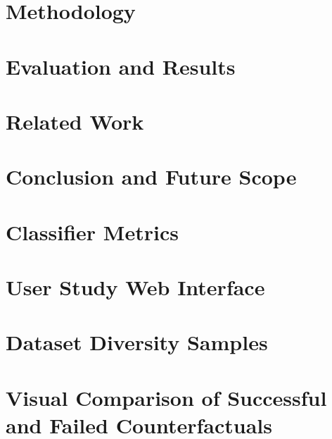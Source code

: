 \cleardoublepage
\chapter{Methodology} \label{Methodology}


\cleardoublepage
\chapter{Evaluation and Results} \label{Evaluation and Results}


\cleardoublepage
\chapter{Related Work} \label{Related work}


\cleardoublepage
\chapter{Conclusion and Future Scope} \label{Conclusion and Future Scope}


\cleardoublepage
\printbibliography[heading=bibintoc]

\cleardoublepage
\appendix
\chapter{Classifier Metrics}
\label{appendix:classifier}


\chapter{User Study Web Interface}
\label{appendix:webinterface}


\chapter{Dataset Diversity Samples}
\label{appendix:diversity}


\chapter{Visual Comparison of Successful and Failed Counterfactuals}
\label{appendix:comparison}


